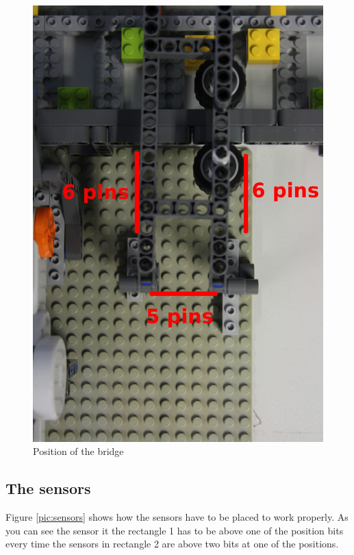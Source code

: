 \documentclass[%
  a4paper,%
  11pt,%
  blue,%
  hyperref	%
  ]{tubsartcl}
\begin{document}
\begin{figure}[!htb]
\begin{center}
\includegraphics[scale=0.35]{graphics_lego/bridge1.jpg}
\end{center}
\caption{Position of the bridge}
\label{pic:bridge1}
\end{figure}

\newpage

\subsection{The sensors}

Figure \ref{pic:sensors} shows how the sensors have to be placed to work properly. As you can see the sensor it the rectangle 1 has to be above one of the position bits every time the sensors in rectangle 2 are above two bits at one of the positions.
\end{document}
